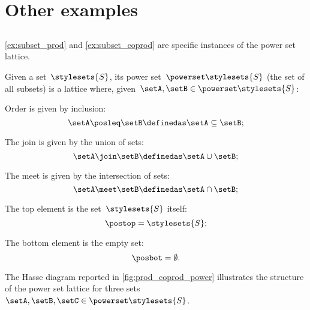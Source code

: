 \section{Other examples}

\subsection{}
\cref{ex:subset_prod} and \cref{ex:subset_coprod} are specific instances of the power set lattice.

\begin{definition}
  \label{def:power-set-as-lattice}
Given a set~$\stylesets{S}$, its power set~$\powerset \stylesets{S}$ (the set of all subsets) is a lattice where, given~$\setA,\setB\in \powerset \stylesets{S}$:
\begin{compactitem}
  \item Order is given by inclusion:
  \begin{equation*}
    \setA\posleq \setB \definedas \setA\subseteq \setB;
  \end{equation*}
  \item The join is given by the union of sets:
  \begin{equation*}
    \setA\join \setB \definedas \setA\cup \setB;
  \end{equation*}
  \item The meet is given by the intersection of sets:
  \begin{equation*}
    \setA\meet \setB \definedas \setA\cap \setB;
  \end{equation*}
  \item The top element is the set~$\stylesets{S}$ itself:
  \begin{equation*}
    \postop = \stylesets{S};
  \end{equation*}
  \item The bottom element is the empty set:
  \begin{equation*}
    \posbot = \emptyset.
  \end{equation*}
\end{compactitem}
\end{definition}

The Hasse diagram reported in \cref{fig:prod_coprod_power} illustrates the structure of the power set lattice for three sets~$\setA,\setB,\setC\in \powerset \stylesets{S}$.

